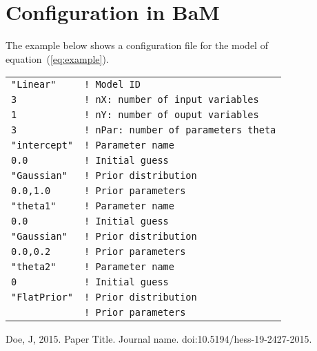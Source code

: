 \documentclass[a4paper]{article}
\begin{document}
\section{Configuration in BaM}
The example below shows a configuration file for the model of equation~(\ref{eq:example}).\\
%
\begin{tcolorbox}
	\begin{tabular}{ll}
		\texttt{"Linear"} & \texttt{! Model ID}\\
		\texttt{3} & \texttt{! nX: number of input variables}\\
		\texttt{1} & \texttt{! nY: number of ouput variables}\\
		\texttt{3} & \texttt{! nPar: number of parameters theta}\\
		\texttt{"intercept"} & \texttt{! Parameter name}\\
		\texttt{0.0} & \texttt{! Initial guess}\\
		\texttt{"Gaussian"} & \texttt{! Prior distribution}\\
		\texttt{0.0,1.0} & \texttt{! Prior parameters}\\
		\texttt{"theta1"} & \texttt{! Parameter name}\\
		\texttt{0.0} & \texttt{! Initial guess}\\
		\texttt{"Gaussian"} & \texttt{! Prior distribution}\\
		\texttt{0.0,0.2} & \texttt{! Prior parameters}\\
		\texttt{"theta2"} & \texttt{! Parameter name}\\
		\texttt{0} & \texttt{! Initial guess}\\
		\texttt{"FlatPrior"} & \texttt{! Prior distribution}\\
		\texttt{} & \texttt{! Prior parameters}\\
	\end{tabular}
\end{tcolorbox}

\begin{thebibliography}{00}

Doe, J, 2015. Paper Title. Journal name. doi:10.5194/hess-19-2427-2015.

\end{thebibliography}
\end{document}
